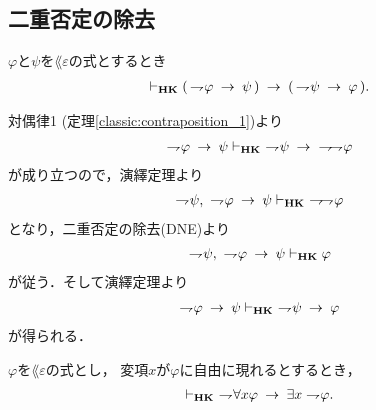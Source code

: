 \subsection{二重否定の除去}
	\begin{screen}
		\begin{thm}[対偶律3]\label{classic:contraposition_3}
			$\varphi$と$\psi$を$\lang{\varepsilon}$の式とするとき
			\begin{align}
				\vdash_{{\scriptsize \mbox{{\bf HK}}}} (\, \rightharpoondown\hspace{-0.25em} \varphi \hspace{0.25em}\rightarrow\hspace{0.25em} \psi\, )
				\hspace{0.25em}\rightarrow\hspace{0.25em} (\, \rightharpoondown\hspace{-0.25em} \psi \hspace{0.25em}\rightarrow\hspace{0.25em} \varphi\, ).
			\end{align}
		\end{thm}
	\end{screen}
	
	\begin{sketch}
		対偶律1 (定理\ref{classic:contraposition_1})より
		\begin{align}
			\negation \varphi \rarrow \psi \provable{\mbox{{\bf HK}}}\ 
			\negation \psi \rarrow\ \negation \negation \varphi
		\end{align}
		が成り立つので，演繹定理より
		\begin{align}
			\rightharpoondown\hspace{-0.25em} \psi,\ \rightharpoondown\hspace{-0.25em} \varphi \hspace{0.25em}\rightarrow\hspace{0.25em} \psi 
			\vdash_{{\scriptsize \mbox{{\bf HK}}}}\ \rightharpoondown\hspace{-0.25em} \rightharpoondown\hspace{-0.25em} \varphi
		\end{align}
		となり，二重否定の除去(DNE)より
		\begin{align}
			\rightharpoondown\hspace{-0.25em} \psi,\ \rightharpoondown\hspace{-0.25em} \varphi \hspace{0.25em}\rightarrow\hspace{0.25em} \psi 
			\vdash_{{\scriptsize \mbox{{\bf HK}}}} \varphi
		\end{align}
		が従う．そして演繹定理より
		\begin{align}
			\rightharpoondown\hspace{-0.25em} \varphi \hspace{0.25em}\rightarrow\hspace{0.25em} \psi 
			\vdash_{{\scriptsize \mbox{{\bf HK}}}}\ \rightharpoondown\hspace{-0.25em} \psi \hspace{0.25em}\rightarrow\hspace{0.25em} \varphi
		\end{align}
		が得られる．
		\QED
	\end{sketch}
	
	\begin{screen}
		\begin{thm}
		\label{classic:strong_De_Morgan_law_for_quantifier_2}
			$\varphi$を$\lang{\varepsilon}$の式とし，
			変項$x$が$\varphi$に自由に現れるとするとき，
			\begin{align}
				\vdash_{{\scriptsize \mbox{{\bf HK}}}}\ \rightharpoondown\hspace{-0.25em} \forall x \varphi \hspace{0.25em}\rightarrow\hspace{0.25em} 
				\exists x \rightharpoondown\hspace{-0.25em} \varphi.
			\end{align}
		\end{thm}
	\end{screen}
	
